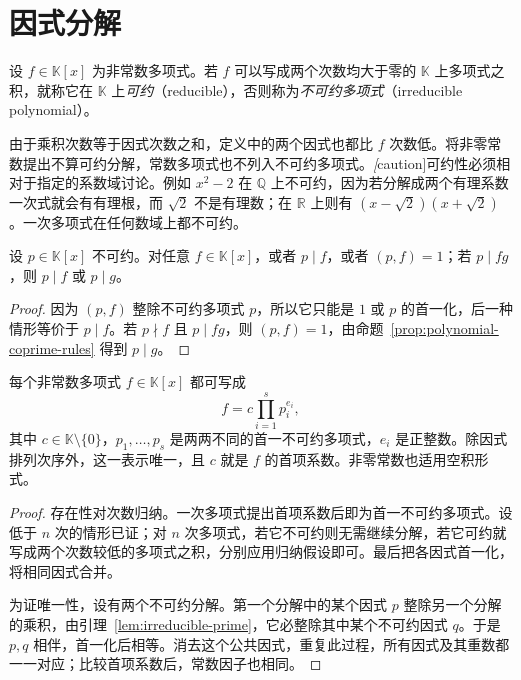 \section{因式分解}
\label{sec:polynomial-factorization}

\begin{definition}
设 $f\in\mathbb K[x]$ 为非常数多项式。若 $f$ 可以写成两个次数均大于零的 $\mathbb K$ 上多项式之积，就称它在 $\mathbb K$ 上\emph{可约}（reducible），否则称为\emph{不可约多项式}（irreducible polynomial）。
\end{definition}

由于乘积次数等于因式次数之和，定义中的两个因式也都比 $f$ 次数低。将非零常数提出不算可约分解，常数多项式也不列入不可约多项式。\emph[caution]{可约性必须相对于指定的系数域讨论。}例如 $x^2-2$ 在 $\mathbb Q$ 上不可约，因为若分解成两个有理系数一次式就会有有理根，而 $\sqrt2$ 不是有理数；在 $\mathbb R$ 上则有 $(x-\sqrt2)(x+\sqrt2)$。一次多项式在任何数域上都不可约。

\begin{lemma}
\label{lem:irreducible-prime}
设 $p\in\mathbb K[x]$ 不可约。对任意 $f\in\mathbb K[x]$，或者 $p\mid f$，或者 $(p,f)=1$；若 $p\mid fg$，则 $p\mid f$ 或 $p\mid g$。
\end{lemma}
\begin{proof}
因为 $(p,f)$ 整除不可约多项式 $p$，所以它只能是 $1$ 或 $p$ 的首一化，后一种情形等价于 $p\mid f$。若 $p\nmid f$ 且 $p\mid fg$，则 $(p,f)=1$，由命题~\ref{prop:polynomial-coprime-rules} 得到 $p\mid g$。
\end{proof}

\begin{theorem}[唯一因式分解定理]
\label{thm:polynomial-unique-factorization}
每个非常数多项式 $f\in\mathbb K[x]$ 都可写成
\begin{equation}
\label{eq:polynomial-standard-factorization}
    f=c\prod_{i=1}^s p_i^{e_i},
\end{equation}
其中 $c\in\mathbb K\setminus\{0\}$，$p_1,\ldots,p_s$ 是两两不同的首一不可约多项式，$e_i$ 是正整数。除因式排列次序外，这一表示唯一，且 $c$ 就是 $f$ 的首项系数。非零常数也适用空积形式。
\end{theorem}
\begin{proof}
存在性对次数归纳。一次多项式提出首项系数后即为首一不可约多项式。设低于 $n$ 次的情形已证；对 $n$ 次多项式，若它不可约则无需继续分解，若它可约就写成两个次数较低的多项式之积，分别应用归纳假设即可。最后把各因式首一化，将相同因式合并。

为证唯一性，设有两个不可约分解。第一个分解中的某个因式 $p$ 整除另一个分解的乘积，由引理~\ref{lem:irreducible-prime}，它必整除其中某个不可约因式 $q$。于是 $p,q$ 相伴，首一化后相等。消去这个公共因式，重复此过程，所有因式及其重数都一一对应；比较首项系数后，常数因子也相同。
\end{proof}


